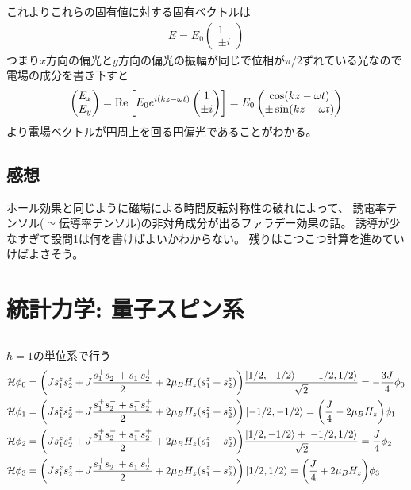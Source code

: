 \documentclass[../../master.tex]{subfiles}
\begin{document}
\subsection{}
これよりこれらの固有値に対する固有ベクトルは
\begin{align}
    E = E_0\begin{pmatrix}
        1\\ \pm i
    \end{pmatrix}
\end{align}
つまり\(x\)方向の偏光と\(y\)方向の偏光の振幅が同じで位相が\(\pi/2\)ずれている光なので
電場の成分を書き下すと
\begin{align}
    \begin{pmatrix}
        E_x\\E_y
    \end{pmatrix}
    =\Re \qty[E_0e^{i(kz-\omega t)}\begin{pmatrix}
        1 \\ \pm i
    \end{pmatrix}]
    =E_0\begin{pmatrix}
        \cos(kz-\omega t)\\
        \pm\sin(kz-\omega t)
    \end{pmatrix}
\end{align}
より電場ベクトルが円周上を回る円偏光であることがわかる。

\section*{感想}
ホール効果と同じように磁場による時間反転対称性の破れによって、
誘電率テンソル(\(\simeq\)伝導率テンソル)の非対角成分が出るファラデー効果の話。
誘導が少なすぎて設問1は何を書けばよいかわからない。
残りはこつこつ計算を進めていけばよさそう。

\chapter{統計力学: 量子スピン系}
\section{}
\(\hbar=1\)の単位系で行う
\begin{align}
    \mathcal{H}\phi_0
        &= \qty(Js_1^zs_2^z+J\frac{s_1^+s_2^-+s_1^-s_2^+}{2}+2\mu_BH_z(s_1^z+s_2^z))\frac{\ket{1/2,-1/2}-\ket{-1/2,1/2}}{\sqrt{2}}
        =-\frac{3J}{4}\phi_0\\
    \mathcal{H}\phi_1
        &= \qty(Js_1^zs_2^z+J\frac{s_1^+s_2^-+s_1^-s_2^+}{2}+2\mu_BH_z(s_1^z+s_2^z))\ket{-1/2,-1/2}
        =\qty(\frac{J}{4}-2\mu_B H_z)\phi_1\\
    \mathcal{H}\phi_2
        &= \qty(Js_1^zs_2^z+J\frac{s_1^+s_2^-+s_1^-s_2^+}{2}+2\mu_BH_z(s_1^z+s_2^z))\frac{\ket{1/2,-1/2}+\ket{-1/2,1/2}}{\sqrt{2}}
        =\frac{J}{4}\phi_2\\
    \mathcal{H}\phi_3
        &= \qty(Js_1^zs_2^z+J\frac{s_1^+s_2^-+s_1^-s_2^+}{2}+2\mu_BH_z(s_1^z+s_2^z))\ket{1/2,1/2}
        =\qty(\frac{J}{4}+2\mu_B H_z)\phi_3\\
\end{align}
\end{document}
